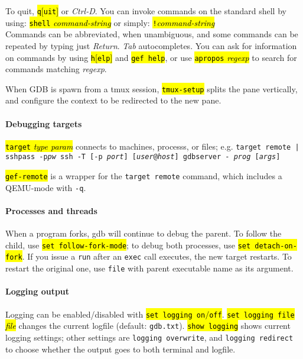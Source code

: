 \documentclass[a4paper,landscape]{article}
\newcommand{\hlc}[2][yellow]{{\sethlcolor{#1} \hl{#2}}}
\newcommand{\gef}[1]{\hlc[skyblue]{#1}}
\begin{document}
\begin{multicols*}{3}
To quit, \hl{\texttt{q}[\texttt{uit}]} or \textit{Ctrl-D}.
You can invoke commands on the standard shell by using:
\hl{\texttt{shell}\textit{ command-string}}
or simply: \hl{\texttt{!}\textit{command-string}} \\
Commands can be abbreviated,
when unambiguous, and some commands can be repeated by typing just
\textit{Return}. \textit{Tab} autocompletes.
You can ask for information on commands by using \hl{\texttt{h}[\texttt{elp}]} and \gef{\texttt{gef help}},
or use \hl{\texttt{apropos} \textit{regexp}} to search for commands matching \textit{regexp}.

When GDB is spawn from a tmux session, \gef{\texttt{tmux-setup}} splits the pane vertically, and configure the context to be redirected to the new pane.

\paragraph{Debugging targets}
\hl{\texttt{target} \textit{type param}} connects to machines, processs, or files; e.g.
\texttt{target remote | sshpass -p\textit{pw} ssh -T [\texttt{-p} \textit{port}] [\textit{user}\texttt{@}\textit{host}] gdbserver - \textit{prog} [\textit{args}]}

\gef{\texttt{gef-remote}} is a wrapper for the \texttt{target remote} command,
which includes a QEMU-mode with \texttt{-q}.

\paragraph{Processes and threads}
When a program forks, gdb will continue to debug the parent.
To follow the child, use \hl{\texttt{set follow-fork-mode}};
to debug both processes, use
\hl{\texttt{set detach-on-fork}}.
If you issue a \texttt{run} after an \texttt{exec} call executes, the new target restarts.
To restart the original one, use \texttt{file} with parent executable name
as its argument. %


\paragraph{Logging output}
Logging can be enabled/disabled with \hl{\texttt{set logging on}/\texttt{off}}.
\hl{\texttt{set logging file}\textit{ file}} changes the current logfile
(default: \texttt{gdb.txt}).
\hl{\texttt{show logging}} shows current logging settings; other settings are
\texttt{logging overwrite}, and
\texttt{logging redirect} to choose whether the output goes to both terminal and logfile.


\end{multicols*}
\end{document}
